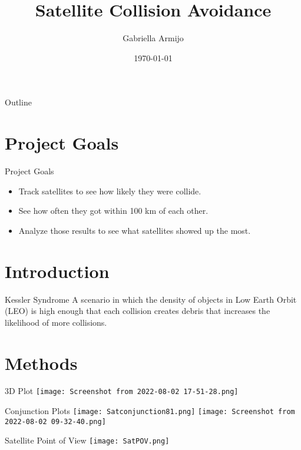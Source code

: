 \documentclass{beamer}
\title{Satellite Collision Avoidance}
\author{Gabriella Armijo}
\institute{Institute for Computing in Research}
\date{\today}
\begin{document}
\begin{frame}
    \titlepage 
\end{frame}

\logo{}


\begin{frame}{Outline}
    \tableofcontents
\end{frame}

\section{Project Goals}
\begin{frame}{Project Goals}
\begin{itemize}
\item Track satellites to see how likely they were collide. 
\item See how often they got within 100 km of each other. 
\item Analyze those results to see what satellites showed up the most.
\end{itemize}
\end{frame}

\section{Introduction}
\begin{frame}{Kessler Syndrome}
A scenario in which the density of objects in Low Earth Orbit (LEO) is high enough that each collision creates debris that increases the likelihood of more collisions.
\end{frame}

\section{Methods}
\begin{frame}{3D Plot}
\texttt{[image: Screenshot from 2022-08-02 17-51-28.png]}
\end{frame}

\begin{frame}{Conjunction Plots}
\texttt{[image: Satconjunction81.png]}
\texttt{[image: Screenshot from 2022-08-02 09-32-40.png]}
\end{frame}

\begin{frame}{Satellite Point of View}
\centering
\texttt{[image: SatPOV.png]}
\end{frame}
\end{document}
